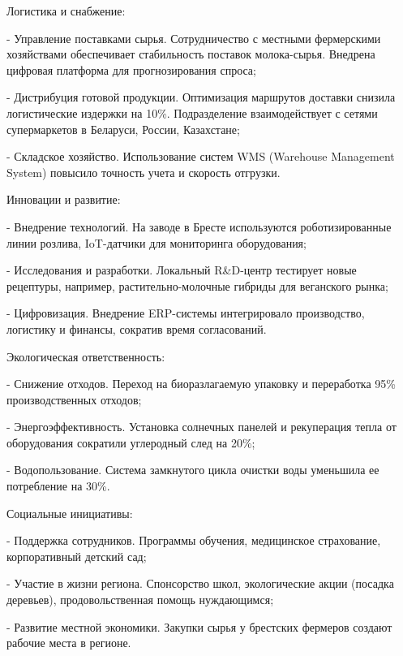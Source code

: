 {	\par \redline Логистика и снабжение:
	
	\par \redline - Управление поставками сырья. Сотрудничество с местными фермерскими хозяйствами обеспечивает стабильность поставок молока-сырья. Внедрена цифровая платформа для прогнозирования спроса;
	\par \redline - Дистрибуция готовой продукции. Оптимизация маршрутов доставки снизила логистические издержки на 10\%. Подразделение взаимодействует с сетями супермаркетов в Беларуси, России, Казахстане;
	\par \redline - Складское хозяйство. Использование систем WMS (Warehouse Management System) повысило точность учета и скорость отгрузки.
	
	\par \redline Инновации и развитие:
	
	\par \redline - Внедрение технологий. На заводе в Бресте используются роботизированные линии розлива, IoT-датчики для мониторинга оборудования;
	\par \redline - Исследования и разработки. Локальный R\&D-центр тестирует новые рецептуры, например, растительно-молочные гибриды для веганского рынка;
	\par \redline - Цифровизация. Внедрение ERP-системы интегрировало производство, логистику и финансы, сократив время согласований.
	
	\par \redline Экологическая ответственность:
	
	\par \redline - Снижение отходов. Переход на биоразлагаемую упаковку и переработка 95\% производственных отходов;
	\par \redline - Энергоэффективность. Установка солнечных панелей и рекуперация тепла от оборудования сократили углеродный след на 20\%;
	\par \redline - Водопользование. Система замкнутого цикла очистки воды уменьшила ее потребление на 30\%.
	
	\par \redline Социальные инициативы:
	
	\par \redline - Поддержка сотрудников. Программы обучения, медицинское страхование, корпоративный детский сад;
	\par \redline - Участие в жизни региона. Спонсорство школ, экологические акции (посадка деревьев), продовольственная помощь нуждающимся;
	\par \redline - Развитие местной экономики. Закупки сырья у брестских фермеров создают рабочие места в регионе.
	
}
